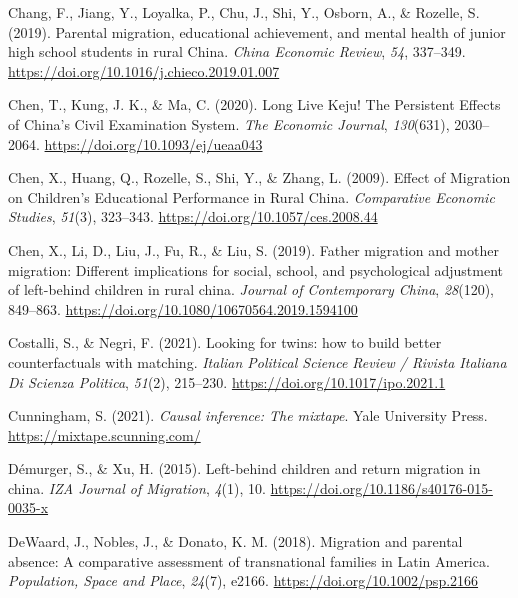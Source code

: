 \documentclass[
  man,floatsintext]{apa7}
\newlength{\cslhangindent}
\newlength{\cslentryspacingunit} %
\newenvironment{CSLReferences}[2] %
 {%
  \setlength{\parindent}{0pt}
  \ifodd #1
  \let\oldpar\par
  \def\par{\hangindent=\cslhangindent\oldpar}
  \fi
  \setlength{\parskip}{#2\cslentryspacingunit}
 }%
 {}
\begin{document}
\begin{CSLReferences}{1}{0}
\leavevmode{}%
Chang, F., Jiang, Y., Loyalka, P., Chu, J., Shi, Y., Osborn, A., \& Rozelle, S. (2019). Parental migration, educational achievement, and mental health of junior high school students in rural China. \emph{China Economic Review}, \emph{54}, 337--349. \url{https://doi.org/10.1016/j.chieco.2019.01.007}

\leavevmode{}%
Chen, T., Kung, J. K., \& Ma, C. (2020). Long Live Keju! The Persistent Effects of China{'}s Civil Examination System. \emph{The Economic Journal}, \emph{130}(631), 2030--2064. \url{https://doi.org/10.1093/ej/ueaa043}

\leavevmode{}%
Chen, X., Huang, Q., Rozelle, S., Shi, Y., \& Zhang, L. (2009). Effect of Migration on Children's Educational Performance in Rural China. \emph{Comparative Economic Studies}, \emph{51}(3), 323--343. \url{https://doi.org/10.1057/ces.2008.44}

\leavevmode{}%
Chen, X., Li, D., Liu, J., Fu, R., \& Liu, S. (2019). Father migration and mother migration: Different implications for social, school, and psychological adjustment of left-behind children in rural china. \emph{Journal of Contemporary China}, \emph{28}(120), 849--863. \url{https://doi.org/10.1080/10670564.2019.1594100}

\leavevmode{}%
Costalli, S., \& Negri, F. (2021). Looking for twins: how to build better counterfactuals with matching. \emph{Italian Political Science Review / Rivista Italiana Di Scienza Politica}, \emph{51}(2), 215--230. \url{https://doi.org/10.1017/ipo.2021.1}

\leavevmode{}%
Cunningham, S. (2021). \emph{Causal inference: The mixtape}. Yale University Press. \url{https://mixtape.scunning.com/}

\leavevmode{}%
Démurger, S., \& Xu, H. (2015). Left-behind children and return migration in china. \emph{IZA Journal of Migration}, \emph{4}(1), 10. \url{https://doi.org/10.1186/s40176-015-0035-x}

\leavevmode{}%
DeWaard, J., Nobles, J., \& Donato, K. M. (2018). Migration and parental absence: A comparative assessment of transnational families in Latin America. \emph{Population, Space and Place}, \emph{24}(7), e2166. \url{https://doi.org/10.1002/psp.2166}


\end{CSLReferences}
\end{document}
